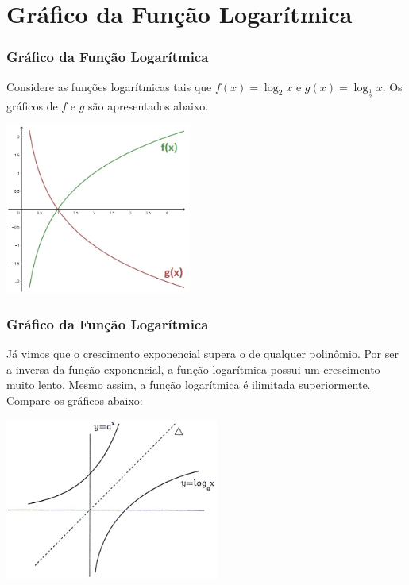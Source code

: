 \section{Gráfico da Função Logarítmica}
\begin{frame}
\frametitle{Gráfico da Função Logarítmica} 

\begin{exemplo}
Considere as funções logarítmicas tais que $f(x) = \log_2 x$ e $g(x)
= \log_{\frac 1 2} x$. Os gráficos de $f$ e $g$ são apresentados
abaixo.
\begin{center}
\includegraphics[width=6.1cm]{figures/graflog.jpg}
\end{center}
\end{exemplo}


\end{frame}


\begin{frame}
\frametitle{Gráfico da Função Logarítmica} 


Já vimos que o crescimento exponencial supera o de qualquer
polinômio. Por ser a inversa da função exponencial, a função
logarítmica possui um crescimento muito lento. Mesmo assim, a função
logarítmica é ilimitada superiormente. Compare os gráficos abaixo:
\begin{center}
\includegraphics[width=7cm]{figures/logXexp.jpg}
\end{center}


\end{frame}
